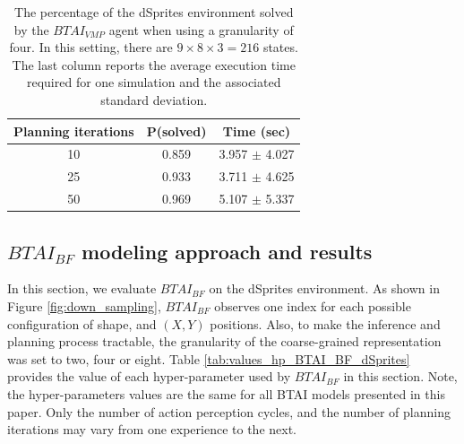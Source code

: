 \documentclass[twoside,11pt]{article}
\begin{document}
\begin{table}[H]
\centering
\begin{tabular}{ |c|c|c| }
 \hline
 Planning iterations & P(solved) & Time (sec) \\
 \hline
 10 & 0.859 & 3.957 $\pm$ 4.027 \\
 \hline
 25 & 0.933 & 3.711 $\pm$ 4.625 \\
 \hline
 50 & 0.969 & 5.107 $\pm$ 5.337 \\
 \hline
\end{tabular}
\caption{The percentage of the dSprites environment solved by the $BTAI_{VMP}$ agent when using a granularity of four. In this setting, there are $9 \times 8 \times 3 = 216$ states. The last column reports the average execution time required for one simulation and the associated standard deviation.}
\label{tab:dSprites_res_4}
\end{table}

\subsection{$BTAI_{BF}$ modeling approach and results} \label{ssec:btai_bf}

In this section, we evaluate $BTAI_{BF}$ \citep{BTAI_BF} on the dSprites environment. As shown in Figure \ref{fig:down_sampling}, $BTAI_{BF}$ observes one index for each possible configuration of shape, and $(X, Y)$ positions. Also, to make the inference and planning process tractable, the granularity of the coarse-grained representation was set to two, four or eight. Table \ref{tab:values_hp_BTAI_BF_dSprites} provides the value of each hyper-parameter used by $BTAI_{BF}$ in this section. Note, the hyper-parameters values are the same for all BTAI models presented in this paper. Only the number of action perception cycles, and the number of planning iterations may vary from one experience to the next.
\end{document}
